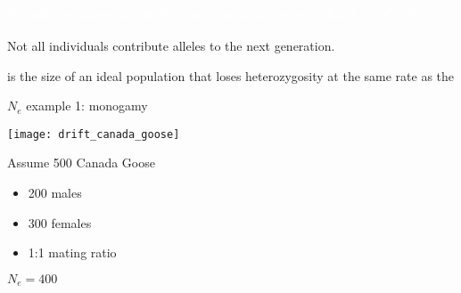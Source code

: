 \documentclass[t]{beamer}
\begin{document}
{
\begin{frame}[t]{\textcolor{white}{\textit{Pelagibacter ubique} may be the most abundant species on Earth $(10^{28}\ \mathrm{cells}).$}}

\vfilll


\end{frame}
}



\begin{frame}[t]{Not all individuals contribute alleles to the next generation.}

\hangpara  {} is the size of an ideal population that loses heterozygosity at the same rate as the 

\end{frame}


\begin{frame}[t]{$N_e$ example 1: monogamy}

\vspace{-\baselineskip}

\raggedcolumns
\begin{multicols}{2}

\noindent\texttt{[image: drift\_canada\_goose]}

\columnbreak
Assume 500 Canada Goose

\begin{itemize}[label=\textcolor{white}{\textbullet}, leftmargin=6pt]
\item 200 males
\item 300 females
\item 1:1 mating ratio
\end{itemize}

\bigskip

\textcolor{orange5}{$N_e = 400$}

\end{multicols}

\end{frame}

\end{document}
